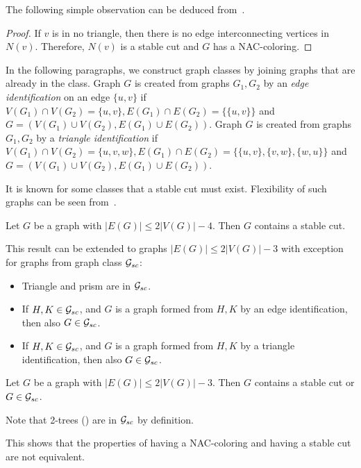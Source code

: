 The following simple observation can be deduced
from~.
%
%
\begin{proof}
	If \( v \) is in no triangle, then there is no edge interconnecting
	vertices in \( N(v) \). Therefore, \( N(v) \) is a stable cut and \( G \)
	has a NAC-coloring.
\end{proof}

In the following paragraphs, we construct graph classes by joining graphs
that are already in the class.
Graph \( G \) is created from graphs \( G_1, G_2 \) by an \emph{edge identification}
on an edge \( \{u, v\} \)
if \( V(G_1) \cap V(G_2) = \{u, v\}, E(G_1) \cap E(G_2) = \{\{u, v\}\} \)
and \( G = (V(G_1) \cup V(G_2), E(G_1) \cup E(G_2)) \).
Graph \( G \) is created from graphs \( G_1, G_2 \) by a \emph{triangle identification}
if \( V(G_1) \cap V(G_2) = \{u, v, w\}, E(G_1) \cap E(G_2) = \{\{u, v\}, \{v, w\}, \{w, u\}\} \)
and \( G = (V(G_1) \cup V(G_2), E(G_1) \cup E(G_2)) \).

It is known for some classes that a stable cut must exist.
Flexibility of such graphs can be seen from~.
%
\begin{theorem}
	Let \( G \) be a graph with \( |E(G)| \le 2|V(G)|-4 \).
	Then \( G \) contains a stable cut.
\end{theorem}
%
This result can be extended to graphs \( |E(G)| \le 2|V(G)|-3 \) with exception
for graphs from graph class \( \mathcal{G}_{sc} \):
%
\begin{itemize}
	\item Triangle and prism are in \( \mathcal{G}_{sc} \).
	\item If \( H, K \in \mathcal{G}_{sc} \), and \( G \) is a graph
	      formed from \( H, K \) by an edge identification,
	      then also \( G \in \mathcal{G}_{sc} \).
	\item If \( H, K \in \mathcal{G}_{sc} \), and \( G \) is a graph
	      formed from \( H, K \) by a triangle identification,
	      then also \( G \in \mathcal{G}_{sc} \).
\end{itemize}
%
%
\begin{theorem}
	Let \( G \) be a graph with \( |E(G)| \le 2|V(G)|-3 \). Then \( G \) contains
	a stable cut or \( G \in \mathcal{G}_{sc} \).
\end{theorem}
%
Note that 2-trees ()
are in \( \mathcal{G}_{sc} \) by definition.
%
%
This shows that the properties of having a NAC-coloring and having a stable cut
are not equivalent.


